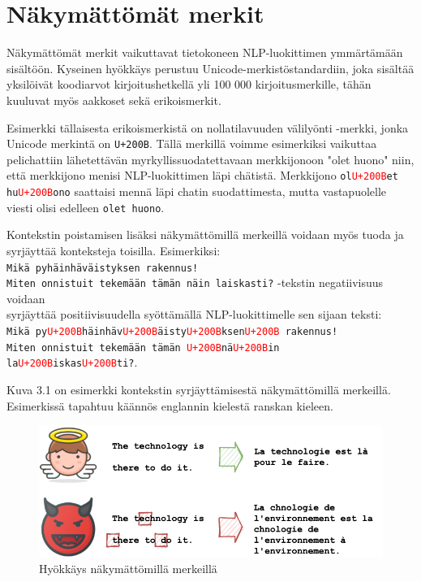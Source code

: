 \section{Näkymättömät merkit}
Näkymättömät merkit vaikuttavat tietokoneen NLP-luokittimen ymmärtämään sisältöön. Kyseinen hyökkäys perustuu Unicode-merkistöstandardiin, joka sisältää yksilöivät koodiarvot kirjoitushetkellä yli 100 000 kirjoitusmerkille, tähän kuuluvat myös aakkoset sekä erikoismerkit.

Esimerkki tällaisesta erikoismerkistä on nollatilavuuden välilyönti -merkki, jonka Unicode merkintä on \texttt{U+200B}. Tällä merkillä voimme esimerkiksi vaikuttaa pelichattiin lähetettävän myrkyllissuodatettavaan merkkijonoon "olet huono" niin, että merkkijono menisi NLP-luokittimen läpi chätistä. Merkkijono \texttt{ol\textcolor{red}{U+200B}et hu\textcolor{red}{U+200B}ono} saattaisi mennä läpi chatin suodattimesta, mutta vastapuolelle viesti olisi edelleen \texttt{olet huono}.

Kontekstin poistamisen lisäksi näkymättömillä merkeillä voidaan myös tuoda ja syrjäyttää konteksteja toisilla. Esimerkiksi:\\
\texttt{Mikä pyhäinhäväistyksen rakennus!\\
  Miten onnistuit tekemään tämän näin laiskasti?} -tekstin negatiivisuus voidaan\\
syrjäyttää positiivisuudella syöttämällä NLP-luokittimelle sen sijaan teksti:\\
\texttt{Mikä py\textcolor{red}{U+200B}häinhäv\textcolor{red}{U+200B}äisty\textcolor{red}{U+200B}ksen\textcolor{red}{U+200B} rakennus!\\
  Miten onnistuit tekemään tämän \textcolor{red}{U+200B}nä\textcolor{red}{U+200B}in la\textcolor{red}{U+200B}iskas\textcolor{red}{U+200B}ti?}.

Kuva 3.1 on esimerkki kontekstin syrjäyttämisestä näkymättömillä merkeillä. Esimerkissä tapahtuu käännös englannin kielestä ranskan kieleen.
\begin{figure}[hbt]
  \includegraphics[scale=0.599]{figures/invisible.png}
  \caption{Hyökkäys näkymättömillä merkeillä \citep{boucher2021bad}}
\end{figure}

